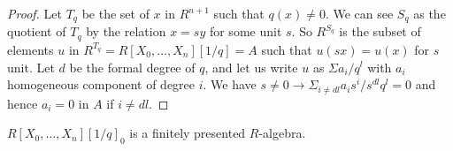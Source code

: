  \begin{proof}
   Let $T_q$ be the set of $x$ in $R^{n+1}$ such that $q(x) \neq 0$. We can see $S_q$ as the quotient of $T_q$
   by the relation $x = sy$ for some unit $s$. So $R^{S_q}$ is the subset of elements $u$ in $R^{T_q} = R[X_0,\dots,X_n][1/q] = A$
   such that $u(sx) = u(x)$ for $s$ unit. Let $d$ be the formal degree of $q$, and let us write $u$ as $\Sigma a_i/q^l$ with
   $a_i$ homogeneous component of degree $i$. We have $s\neq 0\rightarrow \Sigma_{i\neq dl} a_is^i/s^{dl}q^l = 0$ and hence
   $a_i = 0$ in $A$ if $i\neq dl$.
 \end{proof}
 
 \begin{corollary}
   $R[X_0,\dots,X_n][1/q]_0$ is a finitely presented $R$-algebra.
 \end{corollary}
 
